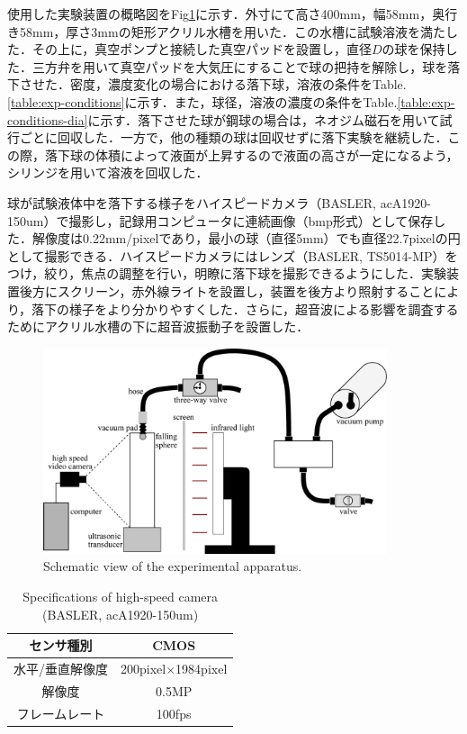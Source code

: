 使用した実験装置の概略図をFig\ref{fig:device}に示す．外寸にて高さ400mm，幅58mm，奥行き58mm，厚さ3mmの矩形アクリル水槽を用いた．この水槽に試験溶液を満たした．その上に，真空ポンプと接続した真空パッドを設置し，直径$D$の球を保持した．三方弁を用いて真空パッドを大気圧にすることで球の把持を解除し，球を落下させた．密度，濃度変化の場合における落下球，溶液の条件をTable.\ref{table:exp-conditions}に示す．また，球径，溶液の濃度の条件をTable.\ref{table:exp-conditions-dia}に示す．落下させた球が鋼球の場合は，ネオジム磁石を用いて試行ごとに回収した．一方で，他の種類の球は回収せずに落下実験を継続した．この際，落下球の体積によって液面が上昇するので液面の高さが一定になるよう，シリンジを用いて溶液を回収した．

球が試験液体中を落下する様子をハイスピードカメラ（BASLER, acA1920-150um）で撮影し，記録用コンピュータに連続画像（bmp形式）として保存した．解像度は0.22mm/pixelであり，最小の球（直径5mm）でも直径22.7pixelの円として撮影できる．ハイスピードカメラにはレンズ（BASLER, TS5014-MP）をつけ，絞り，焦点の調整を行い，明瞭に落下球を撮影できるようにした．実験装置後方にスクリーン，赤外線ライトを設置し，装置を後方より照射することにより，落下の様子をより分かりやすくした．さらに，超音波による影響を調査するためにアクリル水槽の下に超音波振動子を設置した．

\begin{figure}[h]
    \centering
    \includegraphics[width=0.9\textwidth]{2-Methods/device-vacuum.eps}
    \caption{Schematic view of the experimental apparatus.}
    \label{fig:device}
\end{figure}

\begin{table}[h]
    \centering
    \caption{Specifications of high-speed camera (BASLER, acA1920-150um)}
    \label{table:camera}
    \begin{tabular}{c|c}\hline
        センサ種別      & CMOS                      \\ \hline
        水平/垂直解像度 & 200pixel$\times$1984pixel \\ \hline
        解像度          & 0.5MP                     \\ \hline
        フレームレート  & 100fps                    \\ \hline
    \end{tabular}
\end{table}

